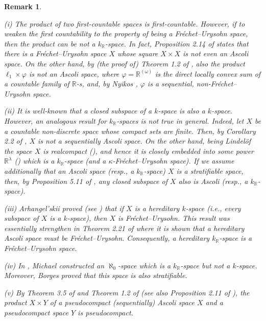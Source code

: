 \documentclass[preprint,11pt]{elsarticle}
\newtheorem{remark}[theorem]{Remark}
\numberwithin{equation}{section}
\numberwithin{theorem}{section}
\newcommand{\w}{\omega}
\newcommand{\IR}{\mathbb{R}}
\begin{document}
\begin{remark} \label{rem:kR-perman} {\em
(i) The product of two first-countable spaces is first-countable. However, if to weaken the first countability to the property of being a Fr\'{e}chet--Urysohn space, then the product can be not a  $k_\IR$-space. In fact,  Proposition 2.14 of \cite{Gabr-seq-Ascoli} states that there is a  Fr\'{e}chet--Urysohn space $X$ whose square $X\times X$ is not even an Ascoli space. On the other hand, by (the proof of) Theorem 1.2 of \cite{Gab-LF}, also the product $\ell_1\times \varphi$ is  not an Ascoli space,  where $\varphi=\IR^{(\w)}$ is the direct locally convex sum of a countable family of $\IR$-s, and, by Nyikos \cite{nyikos},  $\varphi$ is a sequential, non-Fr\'{e}chet--Urysohn space.

(ii) It is well-known that a closed subspace of a $k$-space is also a $k$-space. However, an analogous result for $k_\IR$-spaces is not true in general. Indeed, let $X$ be a countable non-discrete space whose compact sets are finite. Then, by Corollary 2.2 of \cite{Gabr-lc-Ck}, $X$ is not a sequentially Ascoli space. On the other hand, being Lindel\"{o}f the space $X$ is realcompact (\cite[Theorem~3.11.12]{Eng}), and hence it is closely embedded into some power $\IR^\lambda$ (\cite[Theorem~3.11.3]{Eng}) which is a $k_\IR$-space (and a $\kappa$-Fr\'{e}chet--Urysohn space).
If we assume additionally that an Ascoli space (resp., a $k_\IR$-space) $X$ is a stratifiable space, then, by Proposition 5.11 of \cite{BG}, any closed subspace of $X$ also is Ascoli (resp., a $k_\IR$-space).

(iii) Arhangel'skii proved (see \cite[3.12.15]{Eng}) that if $X$ is a hereditary $k$-space (i.e., {\em every} subspace of $X$ is a $k$-space), then $X$ is Fr\'{e}chet--Urysohn. This result was essentially strengthen in Theorem 2.21 of \cite{Gabr-seq-Ascoli} where it is  shown that a hereditary Ascoli space must be Fr\'{e}chet--Urysohn. Consequently, a  hereditary $k_\IR$-space is a Fr\'{e}chet--Urysohn space.

(iv) In \cite{Mi73}, Michael constructed an $\aleph_0$-space which is a $k_\IR$-space but not a $k$-space. Moreover, Borges \cite{Borges-81} proved that this space is also stratifiable.

(v) By Theorem 3.5 of \cite{Frolik-tcc} and Theorem 1.2 of \cite{Gabr-pseudo-Ascoli} (see also Proposition 2.11 of \cite{Gabr-pseudo-Ascoli}), the product $X\times Y$ of a pseudocompact (sequentially) Ascoli  space $X$ and a pseudocompact space $Y$ is pseudocompact.}
\end{remark}
\end{document}
